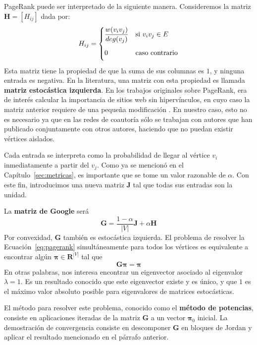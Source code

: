 \documentclass[journal]{IEEEtran}
\newcommand{\matr}[1]{\mathbf{#1}} %
\begin{document}
PageRank puede ser interpretado de la siguiente manera. Consideremos la matriz \(\matr{H} = [H_{ij}]\) dada por:
\begin{equation}
	H_{ij} =
	\begin{dcases}
	\frac{w(v_i v_j)}{deg(v_j)} &\text{si $v_i v_j \in E$}\\
	0\phantom{\frac{1}{|V|}} &\text{caso contrario}
	\end{dcases}
\end{equation}
Esta matriz tiene la propiedad de que la suma de sus columnas es \(1\), y ninguna entrada es negativa. En la literatura, una matriz con esta propiedad es llamada \textbf{matriz estocástica izquierda}. En los trabajos originales sobre PageRank, era de interés calcular la importancia de sitios web sin hipervínculos, en cuyo caso la matriz anterior requiere de una pequeña modificación \cite{google}. En nuestro caso, esto no es necesario ya que en las redes de coautoría sólo se trabajan con autores que han publicado conjuntamente con otros autores, haciendo que no puedan existir vértices aislados.

Cada entrada se interpreta como la probabilidad de llegar al vértice \(v_i\) inmediatamente a partir del \(v_j\). Como ya se mencionó en el Capítulo~\ref{sec:metricas}, es importante que se tome un valor razonable de \(\alpha\). Con este fin, introducimos una nueva matriz \(\matr{J}\) tal que todas sus entradas son la unidad.

La \textbf{matriz de Google} será \cite{langville}
\begin{equation}
	\matr{G} = \frac{1-\alpha}{|V|} \matr{J} + \alpha \matr{H}
\end{equation}
Por convexidad, \(\matr{G}\) también es estocástica izquierda. El problema de resolver la Ecuación~\ref{eq:pagerank} simultáneamente para todos los vértices es equivalente a encontrar algún \(\bm{\pi} \in \mathbf{R}^{|V|} \) tal que
\begin{equation}
	\matr{G} \bm{\pi} = \bm{\pi}
\end{equation}
En otras palabras, nos interesa encontrar un eigenvector asociado al eigenvalor \(\lambda = 1\). Es un resultado conocido que este eigenvector existe y es único, y que \(1\) es el máximo valor absoluto posible para eigenvalores de matrices estocásticas\cite{meyer}.

El método para resolver este problema, conocido como el \textbf{método de potencias}, consiste en aplicaciones iteradas de la matriz \(\matr{G}\) a un vector \(\bm{\pi}_0\) inicial. La demostración de convergencia consiste en descomponer \(\matr{G}\) en bloques de Jordan y aplicar el resultado mencionado en el párrafo anterior\cite{langville}.
\end{document}
